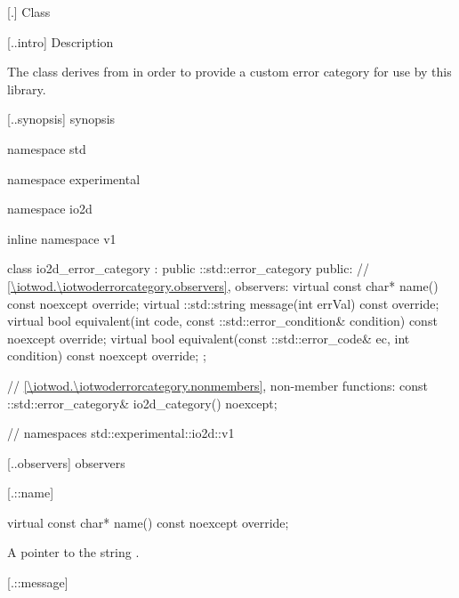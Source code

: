  [\iotwod.\iotwoderrorcategory] {Class }

 [\iotwod.\iotwoderrorcategory.intro] { 
Description}

\pnum
{}%
The  class derives from 
 in order to provide a custom error category for 
use by this library.

 [\iotwod.\iotwoderrorcategory.synopsis] { 
synopsis}

\begin{codeblock}
namespace std { namespace experimental { namespace io2d { inline namespace v1 {
  class io2d_error_category : public ::std::error_category {
  public:
    // \ref{\iotwod.\iotwoderrorcategory.observers}, observers:
    virtual const char* name() const noexcept override;
    virtual ::std::string message(int errVal) const override;
    virtual bool equivalent(int code,
      const ::std::error_condition& condition) const noexcept override;
    virtual bool equivalent(const ::std::error_code& ec,
      int condition) const noexcept override;
  };
  
  // \ref{\iotwod.\iotwoderrorcategory.nonmembers}, non-member functions:
  const ::std::error_category& io2d_category() noexcept;
} } } } // namespaces std::experimental::io2d::v1
\end{codeblock}

 [\iotwod.\iotwoderrorcategory.observers] { 
observers}

 [\iotwod.\iotwoderrorcategory::name] {}

%
%
\begin{itemdecl}
virtual const char* name() const noexcept override;
\end{itemdecl}
\begin{itemdescr}
	\pnum
	\returns
	A pointer to the string .
\end{itemdescr}

 [\iotwod.\iotwoderrorcategory::message] 
{}

